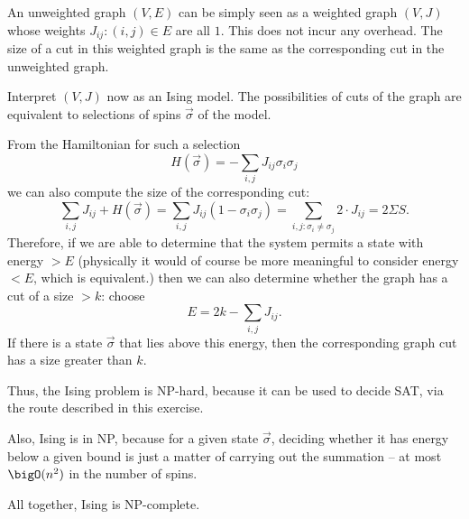 



An unweighted graph $(V,E)$ can be simply seen as a weighted graph $(V,J)$ whose weights $J_{ij}:(i,j)\in E$ are all $1$. This does not incur any overhead.
The size of a cut in this weighted graph is the same as the corresponding cut in the unweighted graph.


Interpret $(V,J)$ now as an Ising model. The possibilities of cuts of the graph are equivalent to selections of spins $\vec\sigma$ of the model.

From the Hamiltonian for such a selection
\[
  H(\vec{\sigma}) = -\sum_{i,j} J_{ij} \sigma_i \sigma_j
\]
we can also compute the size of the corresponding cut:
\[
  \sum_{i,j} J_{ij} + H(\vec\sigma)
   = \sum_{i,j} J_{ij} (1 - \sigma_i \sigma_j)
   = \sum_{i,j: \sigma_i\neq\sigma_j} 2\cdot J_{ij}
   = 2 \Sigma S.
\]
Therefore, if we are able to determine that the system permits a state with energy $>E$ (physically it would of course be more meaningful to consider energy $<E$, which is equivalent.)
then we can also determine whether the graph has a cut of a size $>k$: choose
\[
  E = 2k - \sum_{i,j}J_{ij}.
\]
If there is a state $\vec\sigma$ that lies above this energy, then the corresponding graph cut has a size greater than $k$.

Thus, the Ising problem is NP-hard, because it can be used to decide SAT, via the route described in this exercise.

Also, Ising is in NP, because for a given state $\vec\sigma$, deciding whether it has energy below a given bound is just a matter of carrying out the summation -- at most $\bigO(n^2)$ in the 
number of spins.

All together, Ising is NP-complete.

